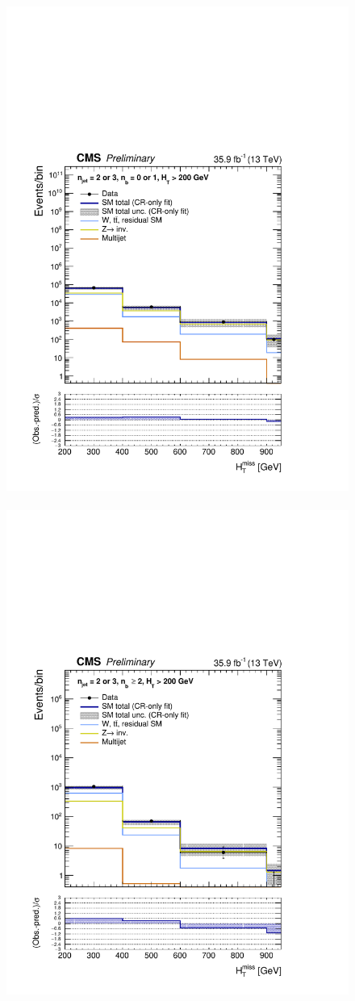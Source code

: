 \begin{figure}[h!]
  \centering
  \caption{
  }
  \includegraphics[width=0.49\linewidth]{figures/results/36invfb/aggregated/postFitShapeCR/mhtShape_eq01b_eq23j_200_Inf_crfit.pdf} ~
  \includegraphics[width=0.49\linewidth]{figures/results/36invfb/aggregated/postFitShapeCR/mhtShape_ge2b_eq23j_200_Inf_crfit.pdf} 
  \label{fig:aggregated_results2}
\end{figure}

